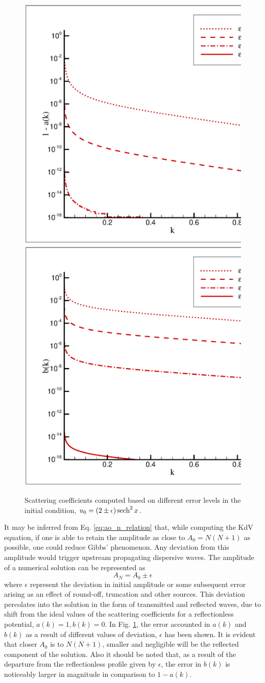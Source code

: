 \begin{figure}[h!]
\centerline{
\includegraphics[width=0.5\linewidth]{Fig_3a}
\includegraphics[width=0.5\linewidth]{Fig_3b}
}
\caption{Scattering coefficients computed based on different error levels in the initial condition, $u_0=(2 \pm \epsilon)\operatorname{sech}^2x$.}
\label{fig:akbk}
\end{figure}

It may be inferred from Eq. \eqref{eq:ao_n_relation} that, while computing the KdV equation, if one is able to retain the amplitude as close to $A_0 = N(N+1)$ as possible, one could reduce Gibbs' phenomenon. Any deviation from this amplitude would trigger upstream propagating dispersive waves. The amplitude of a numerical solution can be represented as
$$ A_N = A_0 \pm \epsilon $$
where $\epsilon$ represent the deviation in initial amplitude or some subsequent error arising as an effect of round-off, truncation and other sources. This deviation percolates into the solution in the form of transmitted and reflected waves, due to shift from the ideal values of the scattering coefficients for a reflectionless potential, $a(k)=1,b(k)=0$. In Fig. \ref{fig:akbk}, the error accounted in $a(k)$ and $b(k)$ as a result of different values of deviation, $\epsilon$ has been shown. It is evident that closer $A_0$ is to $N(N+1)$, smaller and negligible will be the reflected component 
of the solution. Also it should be noted that, as a result of the departure from the reflectionless profile given by $\epsilon$, the error in $b(k)$ is noticeably larger in magnitude in comparison to $1- a(k)$.

